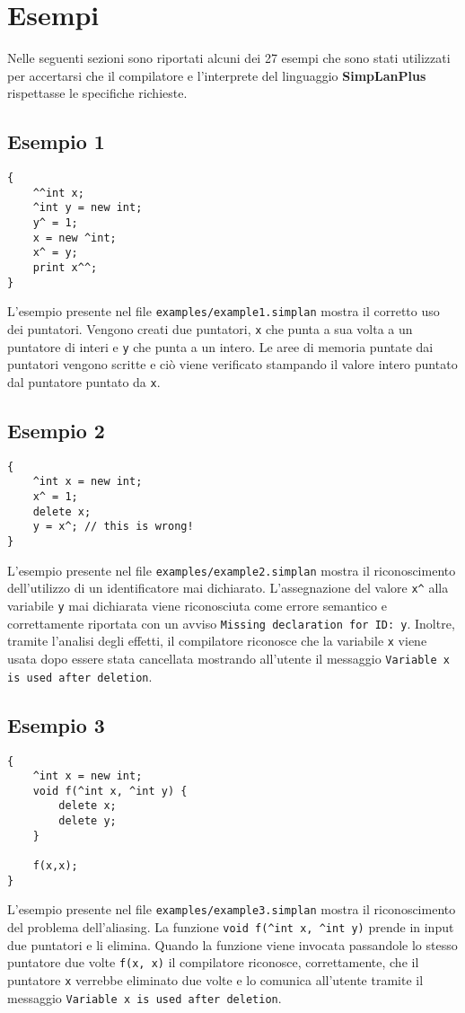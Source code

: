 \documentclass[../report.tex]{subfiles}
\begin{document}
\chapter{Esempi}\label{c:esempi}
Nelle seguenti sezioni sono riportati alcuni dei 27 esempi che sono stati utilizzati per accertarsi che il compilatore e l'interprete del linguaggio \textbf{SimpLanPlus} rispettasse le specifiche richieste.
\section{Esempio 1}\label{s:esempio1}
\begin{lstlisting}
{
    ^^int x;
    ^int y = new int;
    y^ = 1;
    x = new ^int;
    x^ = y;
    print x^^;
}
\end{lstlisting}
L'esempio presente nel file \verb|examples/example1.simplan| mostra il corretto uso dei puntatori.
Vengono creati due puntatori, \verb|x| che punta a sua volta a un puntatore di interi e \verb|y| che punta a un intero.
Le aree di memoria puntate dai puntatori vengono scritte e ciò viene verificato stampando il valore intero puntato dal puntatore puntato da \verb|x|.

\section{Esempio 2}\label{s:esempio2}
\begin{lstlisting}
{
    ^int x = new int;
    x^ = 1;
    delete x;
    y = x^; // this is wrong!
}
\end{lstlisting}
L'esempio presente nel file \verb|examples/example2.simplan| mostra il riconoscimento dell'utilizzo di un identificatore mai dichiarato.
L'assegnazione del valore \verb|x^| alla variabile \verb|y| mai dichiarata viene riconosciuta come errore semantico e correttamente riportata con un avviso \verb|Missing declaration for ID: y|.
Inoltre, tramite l'analisi degli effetti, il compilatore riconosce che la variabile \verb|x| viene usata dopo essere stata cancellata mostrando all'utente il messaggio \verb|Variable x is used after deletion|.

\section{Esempio 3}\label{s:esempio3}
\begin{lstlisting}
{
    ^int x = new int;
    void f(^int x, ^int y) {
        delete x;
        delete y;
    }

    f(x,x);
}
\end{lstlisting}
L'esempio presente nel file \verb|examples/example3.simplan| mostra il riconoscimento del problema dell'aliasing. La funzione \verb|void f(^int x, ^int y)| prende in input due puntatori e li elimina. Quando la funzione viene invocata passandole lo stesso puntatore due volte \verb|f(x, x)| il compilatore riconosce, correttamente, che il puntatore \verb|x| verrebbe eliminato due volte e lo comunica all'utente tramite il messaggio \verb|Variable x is used after deletion|.
\end{document}

